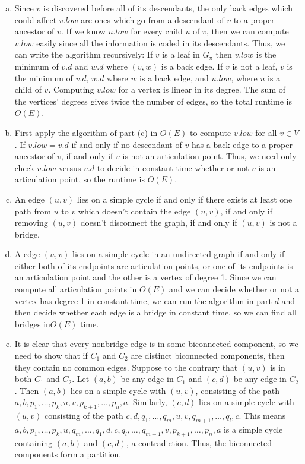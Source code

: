 \documentclass{article}
\begin{document}
\begin{enumerate}[a.]
\item Since $v$ is discovered before all of its descendants, the only back edges which could affect $v.low$ are ones which go from a descendant of $v$ to a proper ancestor of $v$. If we know $u.low$ for every child $u$ of $v$, then we can compute $v.low$ easily since all the information is coded in its descendants.  Thus, we can write the algorithm recursively:  If $v$ is a leaf in $G_\pi$ then $v.low$ is the minimum of $v.d$ and $w.d$ where $(v,w)$ is a back edge.  If $v$ is not a leaf, $v$ is the minimum of $v.d$, $w.d$ where $w$ is a back edge, and $u.low$, where $u$ is a child of $v$.  Computing $v.low$ for a vertex is linear in its degree.  The sum of the vertices' degrees gives twice the number of edges, so the total runtime is $O(E)$.\\

\item First apply the algorithm of part (c) in $O(E)$ to compute $v.low$ for all $v \in V$.  If $v.low = v.d$ if and only if no descendant of $v$ has a back edge to a proper ancestor of $v$, if and only if $v$ is not an articulation point.  Thus, we need only check $v.low$ versus $v.d$ to decide in constant time whether or not $v$ is an articulation point, so the runtime is $O(E)$.\\

\item An edge $(u,v)$ lies on a simple cycle if and only if there exists at least one path from $u$ to $v$ which doesn't contain the edge $(u,v)$, if and only if removing $(u,v)$ doesn't disconnect the graph, if and only if $(u,v)$ is not a bridge. \\

\item A edge $(u,v)$ lies on a simple cycle in an undirected graph if and only if either both of its endpoints are articulation points, or one of its endpoints is an articulation point and the other is a vertex of degree 1.  Since we can compute all articulation points in $O(E)$ and we can decide whether or not a vertex has degree 1 in constant time, we can run the algorithm in part $d$ and then decide whether each edge is a bridge in constant time, so we can find all bridges in$O(E)$ time. \\

\item It is clear that every nonbridge edge is in some biconnected component, so we need to show that if $C_1$ and $C_2$ are distinct biconnected components, then they contain no common edges.  Suppose to the contrary that $(u,v)$ is in both $C_1$ and $C_2$.  Let $(a,b)$ be any edge in $C_1$ and $(c,d)$ be any edge in $C_2$.  Then $(a,b)$ lies on a simple cycle with $(u,v)$, consisting of the path $a, b, p_1, \ldots, p_k, u, v, p_{k+1}, \ldots, p_n, a$.  Similarly, $(c,d)$ lies on a simple cycle with $(u,v)$ consisting of the path $c,d,q_1, \ldots, q_m, u,v, q_{m+1}, \ldots, q_l, c$.  This means $a,b,p_1, \ldots, p_k, u, q_m, \ldots, q_1, d, c, q_l, \ldots, q_{m+1}, v, p_{k+1}, \ldots, p_n, a$ is a simple cycle containing $(a,b)$ and $(c,d)$, a contradiction.  Thus, the biconnected components form a partition. \\


\end{enumerate}
\end{document}
